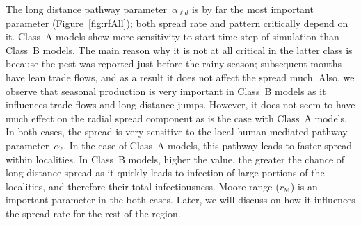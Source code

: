 \documentclass[11pt]{article}
\newcommand{\tuta}{\emph{T.~absoluta}}
\newcommand{\jmcomment}[1]{({\color{cyan}JM: #1})}
\newcommand{\asd}{\alpha_s}
\newcommand{\afm}{\alpha_{\ell}}
\newcommand{\ald}{\alpha_{\ell d}}
\newcommand{\mooreRange}{r_\mathrm{M}}
\theoremstyle{definition}
\begin{document}
The long distance pathway parameter~$\ald$ is by far the most important
parameter (Figure~\ref{fig:rfAll}); both spread rate and pattern critically
depend on it. Class~A models show more sensitivity to start time step of
simulation than Class~B models. The main reason why it is not at all
critical in the latter class is because the pest was reported just before
the rainy season; subsequent months have lean trade flows, and as a result
it does not affect the spread much. Also, we observe that seasonal
production is very important in Class~B models as it influences trade flows
and long distance jumps. However, it does not seem to have much effect on
the radial spread component as is the case with Class~A models. In both
cases, the spread is very sensitive to the local human-mediated pathway
parameter~$\afm$. In the case of Class~A models, this pathway leads to
faster spread within localities. In Class~B models, higher the value, the
greater the chance of long-distance spread as it quickly leads to infection
of large portions of the localities, and therefore their total
infectiousness. Moore range ($\mooreRange$) is an important parameter in
the both cases. Later, we will discuss on how it influences the spread rate
for the rest of the region.



\end{document}
